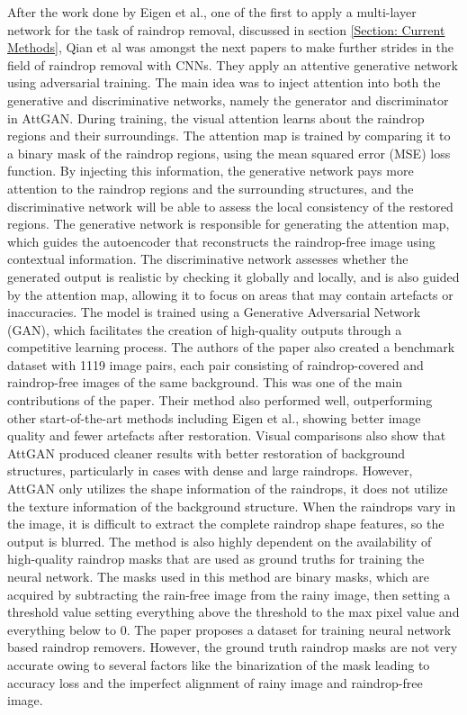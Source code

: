 \documentclass[11pt]{ociamthesis}  %
\begin{document}
After the work done by Eigen et al.\cite{eigen2013restoring}, one of the first to apply a multi-layer network for the task of raindrop removal, discussed in section \ref{Section: Current Methods}, Qian et al\cite{qian2018attentive} was amongst the next papers to make further strides in the field of raindrop removal with CNNs. They apply an attentive generative network using adversarial training. The main idea was to inject attention\cite{bahdanau2014neural} into both the generative and discriminative networks, namely the generator and discriminator in AttGAN. During training, the visual attention learns about the raindrop regions and their surroundings. The attention map is trained by comparing it to a binary mask of the raindrop regions, using the mean squared error (MSE) loss function. By injecting this information, the generative network pays more attention to the raindrop regions and the surrounding structures, and the discriminative network will be able to assess the local consistency of the restored regions. The generative network is responsible for generating the attention map, which guides the autoencoder that reconstructs the raindrop-free image using contextual information. The discriminative network assesses whether the generated output is realistic by checking it globally and locally, and is also guided by the attention map, allowing it to focus on areas that may contain artefacts or inaccuracies. The model is trained using a Generative Adversarial Network (GAN)\cite{goodfellow2014generative}, which facilitates the creation of high-quality outputs through a competitive learning process. The authors of the paper also created a benchmark dataset with 1119 image pairs, each pair consisting of raindrop-covered and raindrop-free images of the same background. This was one of the main contributions of the paper. Their method also performed well, outperforming other start-of-the-art methods including Eigen et al.\cite{eigen2013restoring}, showing better image quality and fewer artefacts after restoration. Visual comparisons also show that AttGAN produced cleaner results with better restoration of background structures, particularly in cases with dense and large raindrops. However, AttGAN only utilizes the shape information of the raindrops, it does not utilize the texture information of the background structure. When the raindrops vary in the image, it is difficult to extract the complete raindrop shape features, so the output is blurred. The method is also highly dependent on the availability of high-quality raindrop masks that are used as ground truths for training the neural network. The masks used in this method are binary masks, which are acquired by subtracting the rain-free image from the rainy image, then setting a threshold value setting everything above the threshold to the max pixel value and everything below to 0. The paper proposes a dataset for training neural network based raindrop removers. However, the ground truth raindrop masks are not very accurate owing to several factors like the binarization of the mask leading to accuracy loss and the imperfect alignment of rainy image and raindrop-free image\cite{quan2019deep}.
\end{document}
